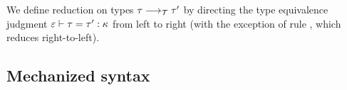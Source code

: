 \documentclass[authoryear, acmsmall, screen, review, nonacm]{acmart}
\begin{document}
We define reduction on types $\tau \longrightarrow_{\mathcal T} \tau'$ by directing the type equivalence judgment $\varepsilon \vdash \tau = \tau' : \kappa$ from left to right (with the exception of rule , which reduces right-to-left).

\subsection{Mechanized syntax}

\begin{code}%
\>[0]\AgdaSpace{}%
\AgdaSpace{}%
\AgdaSymbol{(}\AgdaSpace{}%
\AgdaSymbol{:}\AgdaSpace{}%
\AgdaSymbol{)}\AgdaSpace{}%
\AgdaSymbol{:}\AgdaSpace{}%
\AgdaSpace{}%
\AgdaSpace{}%
\<%
\\
%
\\[\AgdaEmptyExtraSkip]%
\>[0]\AgdaSpace{}%
\AgdaSymbol{:}\AgdaSpace{}%
\AgdaSpace{}%
\AgdaSpace{}%
\AgdaSpace{}%
\AgdaSpace{}%
\<%
\\
\>[0]\AgdaSpace{}%
\AgdaSymbol{=}\AgdaSpace{}%
\AgdaSpace{}%
\<%
\\
%
\\[\AgdaEmptyExtraSkip]%
\>[0]\AgdaSpace{}%
\AgdaSymbol{:}\AgdaSpace{}%
\AgdaSpace{}%
\AgdaSpace{}%
\AgdaSpace{}%
\AgdaOperator{\AgdaInductiveConstructor{R[}}\AgdaSpace{}%
\AgdaSpace{}%
\AgdaOperator{\AgdaInductiveConstructor{]}}\AgdaSpace{}%
\AgdaSpace{}%
\<%
\\
\>[0]\AgdaSpace{}%
\AgdaSymbol{:}\AgdaSpace{}%
\AgdaSpace{}%
\AgdaSymbol{(}\AgdaSpace{}%
\AgdaSymbol{:}\AgdaSpace{}%
\AgdaSpace{}%
\AgdaSpace{}%
\AgdaSpace{}%
\AgdaOperator{\AgdaInductiveConstructor{R[}}\AgdaSpace{}%
\AgdaSpace{}%
\AgdaOperator{\AgdaInductiveConstructor{]}}\AgdaSymbol{)}\AgdaSpace{}%
\AgdaSpace{}%
\AgdaSpace{}%
\AgdaSymbol{(}\AgdaSpace{}%
\AgdaSymbol{)}\<%
\\
%
\\[\AgdaEmptyExtraSkip]%

\end{code}
\end{document}
